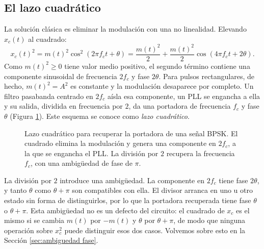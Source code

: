 \subsection{El lazo cuadrático}\label{sec:lazo cuadratico}

La solución clásica es eliminar la modulación con una no linealidad. Elevando $x_c(t)$ al cuadrado:
\begin{equation*}
    x_c(t)^2 = m(t)^2\cos^2(2\pi f_c t+\theta) = \frac{m(t)^2}{2} + \frac{m(t)^2}{2}\cos(4\pi f_c t+2\theta).
\end{equation*}
Como $m(t)^2\geqslant 0$ tiene valor medio positivo, el segundo término contiene una componente sinusoidal de frecuencia $2f_c$ y fase $2\theta$. Para pulsos rectangulares, de hecho, $m(t)^2=A^2$ es constante y la modulación desaparece por completo. Un filtro pasabanda centrado en $2f_c$ aísla esa componente, un PLL se engancha a ella y su salida, dividida en frecuencia por $2$, da una portadora de frecuencia $f_c$ y fase $\theta$ (Figura \ref{fig:lazo cuadratico}). Este esquema se conoce como \emph{lazo cuadrático}.

\begin{figure}
    \begin{center}
    \end{center}
    \caption{Lazo cuadrático para recuperar la portadora de una señal BPSK. El cuadrado elimina la modulación y genera una componente en $2f_c$, a la que se engancha el PLL. La división por $2$ recupera la frecuencia $f_c$, con una ambigüedad de fase de $\pi$.}\label{fig:lazo cuadratico}
\end{figure}

La división por $2$ introduce una ambigüedad. La componente en $2f_c$ tiene fase $2\theta$, y tanto $\theta$ como $\theta+\pi$ son compatibles con ella. El divisor arranca en uno u otro estado sin forma de distinguirlos, por lo que la portadora recuperada tiene fase $\theta$ o $\theta+\pi$. Esta ambigüedad no es un defecto del circuito: el cuadrado de $x_c$ es el mismo si se cambia $m(t)$ por $-m(t)$ y $\theta$ por $\theta+\pi$, de modo que ninguna operación sobre $x_c^2$ puede distinguir esos dos casos. Volvemos sobre esto en la Sección \ref{sec:ambiguedad fase}.


